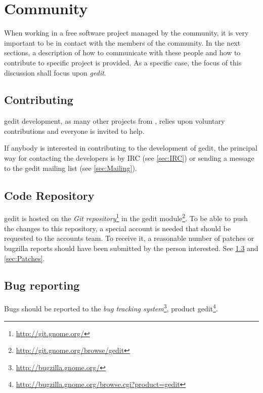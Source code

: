 
\chapter{Community}\label{chap:community}

When working in a free software project managed by the community, it is very important to be in contact with the 
members of the community.  In the next sections, a description of how to communicate with these people and how 
to contribute to specific project is provided.   As a specific case, the focus of this discussion shall focus 
upon \emph{gedit}\cite{website:gedit}.

\section{Contributing}\label{sec:Contributing}

gedit development, as many other projects from \GNOME, relies upon voluntary contributions and everyone is invited to help.

If anybody is interested in contributing to the development of gedit, the principal way for contacting the developers 
is by IRC (see \ref{sec:IRC}) or sending a message to the gedit mailing list (see \ref{sec:Mailing}).

\section{Code Repository}\label{sec:Repository}

gedit is hosted on the \emph{\GNOME Git repository}\footnote{\url{http://git.gnome.org/}} in the 
gedit module\footnote{\url{http://git.gnome.org/browse/gedit}}. To be able to push the changes to this repository, a 
special account is needed that should be requested to the \GNOME accounts team.  To receive it, a reasonable number of patches 
or bugzilla reports should have been submitted by the person interested. See \ref{sec:Bugs} and \ref{sec:Patches}.

\section{Bug reporting}\label{sec:Bugs}

Bugs should be reported to the \emph{\GNOME bug tracking system}\footnote{\url{http://bugzilla.gnome.org/}}, product gedit\footnote{\url{http://bugzilla.gnome.org/browse.cgi?product=gedit}}.

